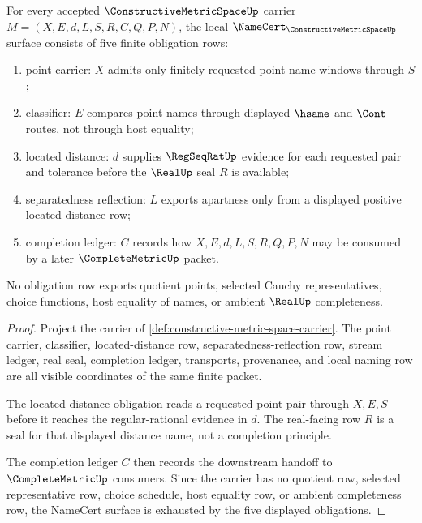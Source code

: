 \begin{theorem}
\label{thm:constructive-metric-space-namecert-obligations}
For every accepted $\ConstructiveMetricSpaceUp$ carrier $M=(X,E,d,L,S,R,C,Q,P,N)$, the local $\NameCert_{\ConstructiveMetricSpaceUp}$ surface consists of five finite obligation rows:
\begin{enumerate}
\item point carrier: $X$ admits only finitely requested point-name windows through $S$;
\item classifier: $E$ compares point names through displayed $\hsame$ and $\Cont$ routes, not through host equality;
\item located distance: $d$ supplies $\RegSeqRatUp$ evidence for each requested pair and tolerance before the $\RealUp$ seal $R$ is available;
\item separatedness reflection: $L$ exports apartness only from a displayed positive located-distance row;
\item completion ledger: $C$ records how $X,E,d,L,S,R,Q,P,N$ may be consumed by a later $\CompleteMetricUp$ packet.
\end{enumerate}
No obligation row exports quotient points, selected Cauchy representatives, choice functions, host equality of names, or ambient $\RealUp$ completeness.
\end{theorem}
\begin{proof}
Project the carrier of \autoref{def:constructive-metric-space-carrier}. The point carrier, classifier, located-distance row, separatedness-reflection row, stream ledger, real seal, completion ledger, transports, provenance, and local naming row are all visible coordinates of the same finite packet.

The located-distance obligation reads a requested point pair through $X,E,S$ before it reaches the regular-rational evidence in $d$. The real-facing row $R$ is a seal for that displayed distance name, not a completion principle.

The completion ledger $C$ then records the downstream handoff to $\CompleteMetricUp$ consumers. Since the carrier has no quotient row, selected representative row, choice schedule, host equality row, or ambient completeness row, the NameCert surface is exhausted by the five displayed obligations.
\end{proof}

